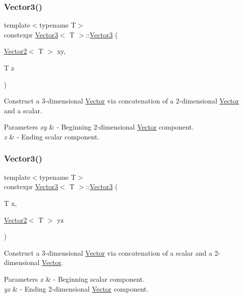 \subsubsection{\texorpdfstring{Vector3()}{Vector3()}\hspace{0.1cm}{\footnotesize\ttfamily [2/4]}}
{\footnotesize\ttfamily template$<$typename T$>$ \\
constexpr \mbox{\hyperlink{class_vector3}{Vector3}}$<$ T $>$\+::\mbox{\hyperlink{class_vector3}{Vector3}} (\begin{DoxyParamCaption}\item[{\mbox{\hyperlink{class_vector2}{Vector2}}$<$ T $>$}]{xy,  }\item[{T}]{z }\end{DoxyParamCaption})}

Construct a 3-\/dimensional \mbox{\hyperlink{class_vector}{Vector}} via concatenation of a 2-\/dimensional \mbox{\hyperlink{class_vector}{Vector}} and a scalar. 
\begin{DoxyParams}{Parameters}
{\em xy} & -\/ Beginning 2-\/dimensional \mbox{\hyperlink{class_vector}{Vector}} component. \\
\hline
{\em z} & -\/ Ending scalar component. \\
\hline
\end{DoxyParams}
\mbox{\label{class_vector3_a4ff09d057f11f07432524c8b903e871f}} 
\subsubsection{\texorpdfstring{Vector3()}{Vector3()}\hspace{0.1cm}{\footnotesize\ttfamily [3/4]}}
{\footnotesize\ttfamily template$<$typename T$>$ \\
constexpr \mbox{\hyperlink{class_vector3}{Vector3}}$<$ T $>$\+::\mbox{\hyperlink{class_vector3}{Vector3}} (\begin{DoxyParamCaption}\item[{T}]{x,  }\item[{\mbox{\hyperlink{class_vector2}{Vector2}}$<$ T $>$}]{yz }\end{DoxyParamCaption})}

Construct a 3-\/dimensional \mbox{\hyperlink{class_vector}{Vector}} via concatenation of a scalar and a 2-\/dimensional \mbox{\hyperlink{class_vector}{Vector}}. 
\begin{DoxyParams}{Parameters}
{\em x} & -\/ Beginning scalar component. \\
\hline
{\em yz} & -\/ Ending 2-\/dimensional \mbox{\hyperlink{class_vector}{Vector}} component. \\
\hline
\end{DoxyParams}
\mbox{\label{class_vector3_a071a8ad60a3a8ab6e07b868c5c5fd617}} 

